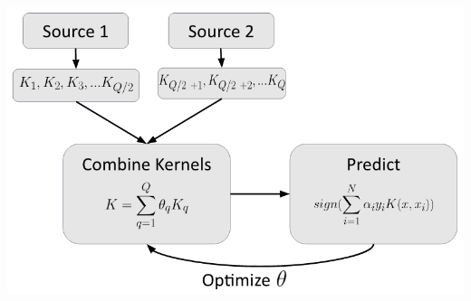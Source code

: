 \documentclass[8pts]{paper}
\begin{document}
\begin{minipage}{\linewidth}
\begin{center}
\includegraphics[scale=.4]{implementation_flowchart}
\end{center}
\end{minipage}
\end{document}
